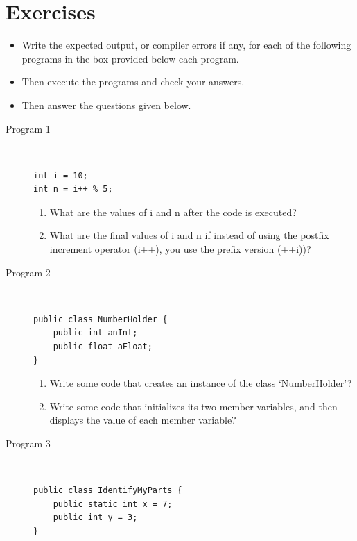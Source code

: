 \documentclass[11pt,a4paper]{article}
\def\AnswerBox{\fbox{\begin{minipage}{4in}\hfill\vspace{0.5in}\end{minipage}}}
\begin{document}
\section*{Exercises}
\begin{itemize}
\item Write the expected output, or compiler errors if any, for each of the following programs in the box provided below each program.
\item Then execute the programs and check your answers.
\item Then answer the questions given below.
\end{itemize}
\begin{description}
\item [Program 1]\
\begin{lstlisting}
int i = 10;
int n = i++ % 5;
\end{lstlisting}

\AnswerBox

\begin{enumerate}[label=\bfseries Q\arabic*:]\itemsep10pt
\item What are the values of i and n after the code is executed?
\item What are the final values of i and n if instead of using the postfix increment operator (i++), you use the prefix version (++i))?
\end{enumerate}

\item [Program 2]\
\begin{lstlisting}
public class NumberHolder {
    public int anInt;
    public float aFloat;
}
\end{lstlisting}

\AnswerBox

\begin{enumerate}[label=\bfseries Q\arabic*:]\itemsep10pt
\item Write some code that creates an instance of the class `NumberHolder'?
\item Write some code that initializes its two member variables, and then displays the value of each member variable?
\end{enumerate}

\item [Program 3]\
\begin{lstlisting}
public class IdentifyMyParts {
    public static int x = 7; 
    public int y = 3; 
}
\end{lstlisting}

\AnswerBox


\end{description}
\end{document}
